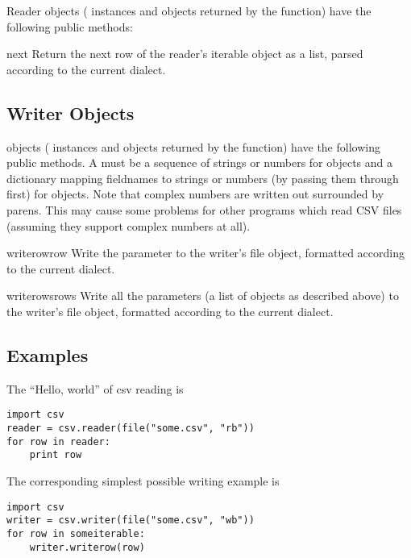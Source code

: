 Reader objects ( instances and objects returned by
the  function) have the following public methods:

\begin{methoddesc}{next}{}
Return the next row of the reader's iterable object as a list, parsed
according to the current dialect.
\end{methoddesc}


\subsection{Writer Objects}

 objects ( instances and objects returned by
the  function) have the following public methods.  A
{} must be a sequence of strings or numbers for 
objects and a dictionary mapping fieldnames to strings or numbers (by
passing them through  first) for {}
objects.  Note that complex numbers are written out surrounded by parens.
This may cause some problems for other programs which read CSV files
(assuming they support complex numbers at all).

\begin{methoddesc}{writerow}{row}
Write the  parameter to the writer's file object, formatted
according to the current dialect.
\end{methoddesc}

\begin{methoddesc}{writerows}{rows}
Write all the  parameters (a list of  objects as
described above) to the writer's file object, formatted
according to the current dialect.
\end{methoddesc}


\subsection{Examples}

The ``Hello, world'' of csv reading is

\begin{verbatim}
import csv
reader = csv.reader(file("some.csv", "rb"))
for row in reader:
    print row
\end{verbatim}

The corresponding simplest possible writing example is

\begin{verbatim}
import csv
writer = csv.writer(file("some.csv", "wb"))
for row in someiterable:
    writer.writerow(row)
\end{verbatim}

